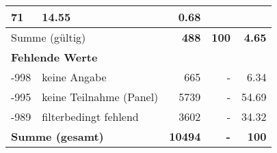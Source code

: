 \begin{longtable}{lXrrr}
       \num{71} &
       \num[round-mode=places,round-precision=2]{14.55} &
         \num[round-mode=places,round-precision=2]{0.68} \\
     \midrule
     \multicolumn{2}{l}{Summe (gültig)} &
       \textbf{\num{488}} &
     \textbf{\num{100}} &
       \textbf{\num[round-mode=places,round-precision=2]{4.65}} \\
     \multicolumn{5}{l}{\textbf{Fehlende Werte}}\\
       -998 &
       keine Angabe &
         \num{665} &
        - &
         \num[round-mode=places,round-precision=2]{6.34} \\
       -995 &
       keine Teilnahme (Panel) &
         \num{5739} &
        - &
         \num[round-mode=places,round-precision=2]{54.69} \\
       -989 &
       filterbedingt fehlend &
         \num{3602} &
        - &
         \num[round-mode=places,round-precision=2]{34.32} \\
     \midrule
     \multicolumn{2}{l}{\textbf{Summe (gesamt)}} &
          \textbf{\num{10494}} &
        \textbf{-} &
        \textbf{\num{100}} \\
     \bottomrule
     \end{longtable}
     
